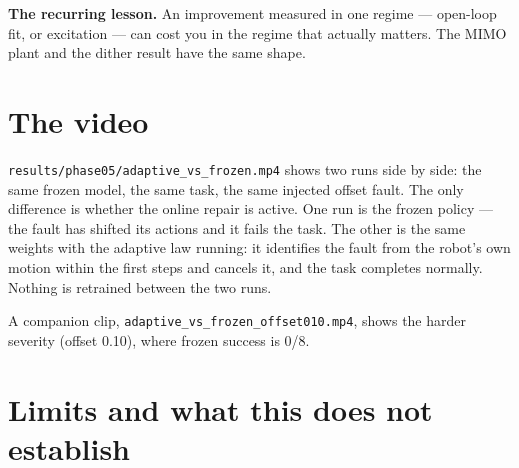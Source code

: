 \documentclass[11pt,a4paper]{article}
\newcommand{\code}[1]{\texttt{\small #1}}
\begin{document}
\begin{tcolorbox}[colback=gray!6,colframe=gray!55!black]
\textbf{The recurring lesson.} An improvement measured in one regime --- open-loop
fit, or excitation --- can cost you in the regime that actually matters. The MIMO
plant and the dither result have the same shape.
\end{tcolorbox}

\section{The video}

\code{results/phase05/adaptive\_vs\_frozen.mp4} shows two runs side by side: the
same frozen model, the same task, the same injected offset fault. The only
difference is whether the online repair is active. One run is the frozen policy
--- the fault has shifted its actions and it fails the task. The other is the same
weights with the adaptive law running: it identifies the fault from the robot's
own motion within the first steps and cancels it, and the task completes normally.
Nothing is retrained between the two runs.

A companion clip, \code{adaptive\_vs\_frozen\_offset010.mp4}, shows the harder
severity (offset 0.10), where frozen success is 0/8.

\section{Limits and what this does not establish}
\label{sec:limits}
\end{document}
